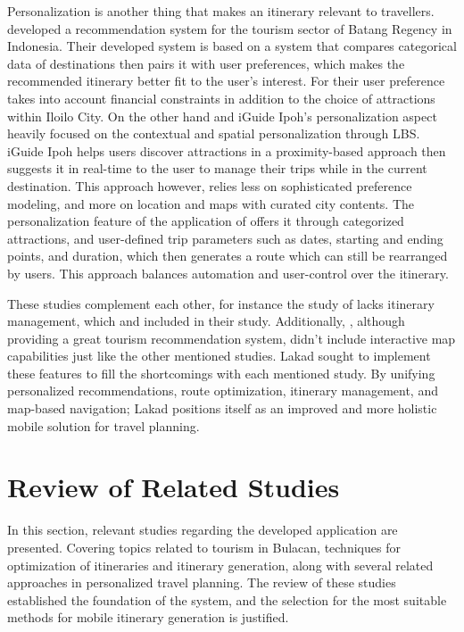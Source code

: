 Personalization is another thing that makes an itinerary relevant to travellers. \textcite{Yulfihani2024} developed a recommendation system for the tourism sector of Batang Regency in Indonesia. Their developed system is based on a system that compares categorical data of destinations then pairs it with user preferences, which makes the recommended itinerary better fit to the user’s interest. For \textcite{Estilo2023} their user preference takes into account financial constraints in addition to the choice of attractions within Iloilo City. On the other hand \textcite{Rahman2025} and iGuide Ipoh’s personalization aspect heavily focused on the contextual and spatial personalization through LBS. iGuide Ipoh helps users discover attractions in a proximity-based approach then suggests it in real-time to the user to manage their trips while in the current destination. This approach however, relies less on sophisticated preference modeling, and more on location and maps with curated city contents. The personalization feature of the application of \textcite{Loh2022} offers it through categorized attractions, and user-defined trip parameters such as dates, starting and ending points, and duration, which then generates a route which can still be rearranged by users. This approach balances automation and user-control over the itinerary.

These studies complement each other, for instance the study of \textcite{Estilo2023} lacks itinerary management, which \textcite{Loh2022} and \textcite{Rahman2025} included in their study. Additionally, \textcite{Yulfihani2024}, although providing a great tourism recommendation system, didn’t include interactive map capabilities just like the other mentioned studies. Lakad sought to implement these features to fill the shortcomings with each mentioned study. By unifying personalized recommendations, route optimization, itinerary management, and map-based navigation; Lakad positions itself as an improved and more holistic mobile solution for travel planning.


\section{Review of Related Studies}

In this section, relevant studies regarding the developed application are presented. Covering topics related to tourism in Bulacan, techniques for optimization of itineraries and itinerary generation, along with several related approaches in personalized travel planning. The review of these studies established the foundation of the system, and the selection for the most suitable methods for mobile itinerary generation is justified.

